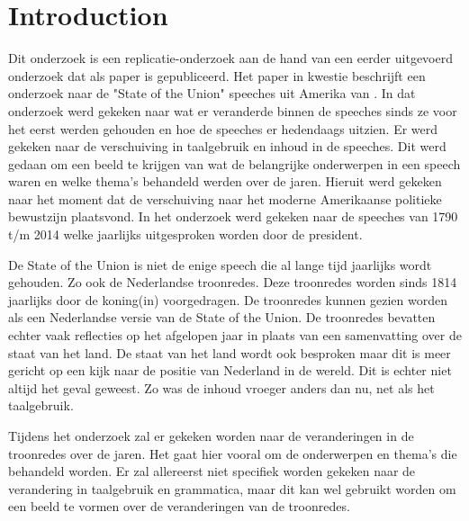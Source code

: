 \section{Introduction}
\label{sec:intro}


Dit onderzoek is een replicatie-onderzoek aan de hand van een eerder uitgevoerd onderzoek dat als paper is gepubliceerd. Het paper in kwestie beschrijft een onderzoek naar de "State of the Union" speeches uit Amerika van \cite{state}. In dat onderzoek werd gekeken naar wat er veranderde binnen de speeches sinds ze voor het eerst werden gehouden en hoe de speeches er hedendaags uitzien. Er werd gekeken naar de verschuiving in taalgebruik en inhoud in de speeches. Dit werd gedaan om een beeld te krijgen van wat de belangrijke onderwerpen in een speech waren en welke thema's behandeld werden over de jaren. Hieruit werd gekeken naar het moment dat de verschuiving naar het moderne Amerikaanse politieke bewustzijn plaatsvond. In het onderzoek werd gekeken naar de speeches van 1790 t/m 2014 welke jaarlijks uitgesproken worden door de president.

De State of the Union is niet de enige speech die al lange tijd jaarlijks wordt gehouden. Zo ook de Nederlandse troonredes. Deze troonredes worden sinds 1814 jaarlijks door de koning(in) voorgedragen. De troonredes kunnen gezien worden als een Nederlandse versie van de State of the Union. De troonredes bevatten echter vaak reflecties op het afgelopen jaar in plaats van een samenvatting over de staat van het land. De staat van het land wordt ook besproken maar dit is meer gericht op een kijk naar de positie van Nederland in de wereld. Dit is echter niet altijd het geval geweest. Zo was de inhoud vroeger anders dan nu, net als het taalgebruik.

Tijdens het onderzoek zal er gekeken worden naar de veranderingen in de troonredes over de jaren. Het gaat hier vooral om de onderwerpen en thema's die behandeld worden. Er zal allereerst niet specifiek worden gekeken naar de verandering in taalgebruik en grammatica, maar dit kan wel gebruikt worden om een beeld te vormen over de veranderingen van de troonredes.


